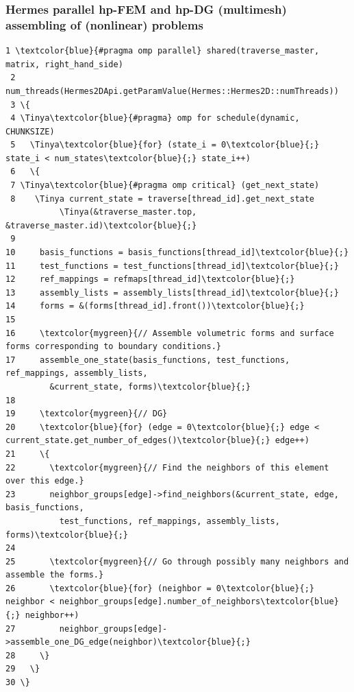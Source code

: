 \documentclass{beamer}
\begin{document}
\begin{frame}[fragile]
\frametitle{Hermes parallel hp-FEM and hp-DG (multimesh) assembling of (nonlinear) problems}
\begin{Verbatim}[commandchars=\\\{\}, fontsize=\Tiny]
 1 \textcolor{blue}{#pragma omp parallel} shared(traverse_master, matrix, right_hand_side)
 2 num_threads(Hermes2DApi.getParamValue(Hermes::Hermes2D::numThreads))
 3 \{
 4 \Tinya\textcolor{blue}{#pragma} omp for schedule(dynamic, CHUNKSIZE)
 5   \Tinya\textcolor{blue}{for} (state_i = 0\textcolor{blue}{;} state_i < num_states\textcolor{blue}{;} state_i++)
 6   \{
 7 \Tinya\textcolor{blue}{#pragma omp critical} (get_next_state)
 8    \Tinya current_state = traverse[thread_id].get_next_state
           \Tinya(&traverse_master.top, &traverse_master.id)\textcolor{blue}{;}
 9
10     basis_functions = basis_functions[thread_id]\textcolor{blue}{;}
11     test_functions = test_functions[thread_id]\textcolor{blue}{;}
12     ref_mappings = refmaps[thread_id]\textcolor{blue}{;}
13     assembly_lists = assembly_lists[thread_id]\textcolor{blue}{;}
14     forms = &(forms[thread_id].front())\textcolor{blue}{;}
15 
16     \textcolor{mygreen}{// Assemble volumetric forms and surface forms corresponding to boundary conditions.}
17     assemble_one_state(basis_functions, test_functions, ref_mappings, assembly_lists,
         &current_state, forms)\textcolor{blue}{;}
18 
19     \textcolor{mygreen}{// DG}
20     \textcolor{blue}{for} (edge = 0\textcolor{blue}{;} edge < current_state.get_number_of_edges()\textcolor{blue}{;} edge++)
21     \{
22       \textcolor{mygreen}{// Find the neighbors of this element over this edge.}
23       neighbor_groups[edge]->find_neighbors(&current_state, edge, basis_functions, 
           test_functions, ref_mappings, assembly_lists, forms)\textcolor{blue}{;}
24       
25       \textcolor{mygreen}{// Go through possibly many neighbors and assemble the forms.}
26       \textcolor{blue}{for} (neighbor = 0\textcolor{blue}{;} neighbor < neighbor_groups[edge].number_of_neighbors\textcolor{blue}{;} neighbor++)
27         neighbor_groups[edge]->assemble_one_DG_edge(neighbor)\textcolor{blue}{;}
28     \}
29   \}
30 \}
\end{Verbatim}
\end{frame}
\end{document}
